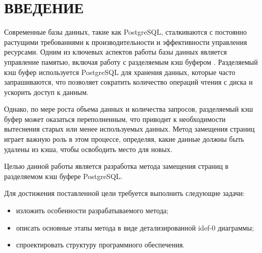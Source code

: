 \chapter*{ВВЕДЕНИЕ}

Современные базы данных, такие как PostgreSQL, сталкиваются с постоянно растущими требованиями к производительности и эффективности управления ресурсами.
Одним из ключевых аспектов работы базы данных является управление памятью, включая работу с разделяемым кэш буфером \cite{yuan2022learned}.
Разделяемый кэш буфер используется PostgreSQL для хранения данных, которые часто запрашиваются, что позволяет сократить количество операций чтения с диска и ускорить доступ к данным.

Однако, по мере роста объема данных и количества запросов, разделяемый кэш буфер может оказаться переполненным, что приводит к необходимости вытеснения старых или менее используемых данных. Метод замещения страниц играет важную роль в этом процессе, определяя, какие данные должны быть удалены из кэша, чтобы освободить место для новых.

Целью данной работы является разработка метода замещения страниц в разделяемом кэш буфере PostgreSQL.

Для достижения поставленной цели требуется выполнить следующие задачи:
\begin{itemize}
	\item изложить особенности разрабатываемого метода;
	\item описать основные этапы метода в виде детализированной idef-0 диаграммы;
	\item спроектировать структуру программного обеспечения.
\end{itemize}